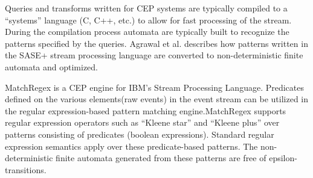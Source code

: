 Queries and transforms written for CEP systems are
typically compiled to a “systems” language (C, C++, etc.) to allow for fast
processing of the stream. During the compilation process automata are typically
built to recognize the patterns specified by the queries. Agrawal et
al.\cite{DBLP:conf/sigmod/AgrawalDGI08} describes how patterns written in the SASE+ stream
processing language are converted to non-deterministic finite automata and
optimized.

MatchRegex\cite{DBLP:conf/debs/Hirzel12} is a CEP engine for IBM’s Stream Processing
Language. Predicates defined on the various elements(raw events) in the event
stream can be utilized in the regular expression-based pattern matching
engine.MatchRegex supports regular expression operators such as “Kleene star”
and “Kleene plus” over patterns consisting of predicates (boolean expressions).
Standard regular expression semantics apply over these predicate-based patterns.
The non-deterministic finite automata generated from these patterns are free of
epsilon-transitions.
